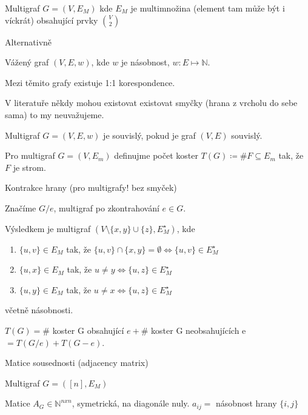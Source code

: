 \documentclass[../main.tex]{subfiles}
\begin{document}
\begin{definition}
    Multigraf $G=(V,E_M)$ kde $E_M$ je multimnožina (element tam  může být i víckrát) obsahující prvky $\binom{V}{2}$
\end{definition}

Alternativně 
\begin{definition}
    Vážený graf $(V,E,w)$, kde $w$ je násobnost, $w:E\mapsto \mathbb{N}$.
\end{definition}

Mezi těmito grafy existuje 1:1 korespondence.

\begin{remark}
    V literatuře někdy mohou existovat existovat 
    smyčky (hrana z vrcholu do sebe sama) to my neuvažujeme. 
\end{remark}


\begin{definition}
    Multigraf $G=(V,E,w)$ je souvislý, pokud je graf $(V,E)$ souvislý.
\end{definition}


\begin{definition}
    Pro multigraf $G=(V,E_m)$ definujme počet koster $T(G) \coloneq \# F \subseteq E_m$ tak, že $F$ je strom. 
\end{definition}


\begin{definition}
    Kontrakce hrany (pro multigrafy! bez smyček)
    
    Značíme $G/e$, multigraf po zkontrahování $e\in G$.

    Výsledkem je multigraf $(V\setminus\{x,y\}\cup \{z\}, E^\star_M)$, kde
    \begin{enumerate}
        \item $\{u,v\}\in E_M$ tak, že $\{u,v\} \cap \{x,y\} = \emptyset \Leftrightarrow \{u,v\} \in E^\star_M$
        \item $\{u,x\}\in E_M$ tak, že $u\neq y \Leftrightarrow \{u,z\}\in E^\star_M$
        \item $\{u,y\}\in E_M$ tak, že $u\neq x \Leftrightarrow \{u,z\}\in E^\star_M$ 
    \end{enumerate}
    včetně násobnosti. 
\end{definition}


\begin{claim}
    $T(G) = \#$ koster G obsahující $e + \#$ koster G neobsahujících e $= T(G/e) + T(G-e)$. 
\end{claim}

\begin{definition}
    Matice sousednosti (adjacency matrix)

    Multigraf $G = ([n], E_M)$

    Matice $A_G\in \mathbb{N}^{nxn}$, symetrická, na diagonále nuly. $a_{ij} = $ násobnost hrany $\{i,j\}$
\end{definition}
\end{document}
